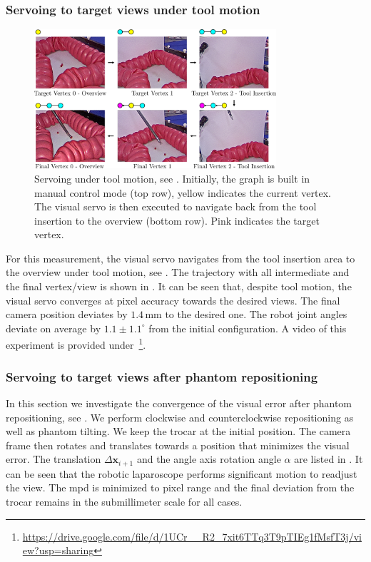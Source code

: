\subsubsection{Servoing to target views under tool motion}
\label{c2:sec:clin_res_tool}
\begin{figure}[tb]
    \centering
    \includegraphics[width=0.8\textwidth]{img/tool_insertion_trajectory.pdf}
    \caption{Servoing under tool motion, see . Initially, the graph is built in manual control mode (top row), yellow indicates the current vertex. The visual servo is then executed to navigate back from the tool insertion to the overview (bottom row). Pink indicates the target vertex.}
    \label{c2:fig:tool_insertion_trajectory}
\end{figure}
For this measurement, the visual servo navigates from the tool insertion area to the overview under tool motion, see . The trajectory with all intermediate and the final vertex/view is shown in . It can be seen that, despite tool motion, the visual servo converges at pixel accuracy towards the desired views. The final camera position deviates by $1.4\,\text{mm}$ to the desired one. The robot joint angles deviate on average by $1.1\pm1.1^\circ$ from the initial configuration. A video of this experiment is provided under\ \footnote{\label{foot:vid}\url{https://drive.google.com/file/d/1UCr__R2_7xit6TTq3T9pTIEg1fMsfT3j/view?usp=sharing}}.

\subsubsection{Servoing to target views after phantom repositioning}
\label{c2:sec:clin_res_re}
In this section we investigate the convergence of the visual error after phantom repositioning, see . We perform clockwise and counterclockwise repositioning as well as phantom tilting. We keep the trocar at the initial position. The camera frame then rotates and translates towards a position that minimizes the visual error. The translation $\Delta\mathbf{x}_{i+1}$ and the angle axis rotation angle $\alpha$ are listed in . It can be seen that the robotic laparoscope performs significant motion to readjust the view. The \acrshort{mpd} is minimized to pixel range and the final deviation from the trocar remains in the submillimeter scale for all cases. 

